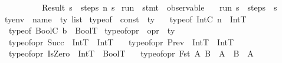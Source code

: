 \begin{isabellebody}
\ \ \ \ \ \ \ \ \ {\isacharbar}\ Result\ s{\isacharprime}\ {\isasymRightarrow}\ steps\ n\ s{\isacharprime}{\isacharparenright}{\isachardoublequoteclose}\isanewline
\isanewline
{}\isamarkupfalse \ run\ {\isacharcolon}{\isacharcolon}\ {\isachardoublequoteopen}stmt\ {\isasymRightarrow}\ observable{\isachardoublequoteclose}\ \isanewline
\ \ {\isachardoublequoteopen}run\ s\ {\isasymequiv}\ steps\ {}{}{}{}{}{}{}\ {\isacharparenleft}s{\isacharcomma}{\isacharbrackleft}{\isacharbrackright}{\isacharcomma}{\isacharbrackleft}{\isacharbrackright}{\isacharcomma}{\isacharbrackleft}{\isacharbrackright}{\isacharcomma}{\isacharbrackleft}{\isacharbrackright}{\isacharparenright}{\isachardoublequoteclose}
\isamarkuptrue {}\isamarkupfalse \ ty{\isacharunderscore}env\ {\isacharequal}\ {\isachardoublequoteopen}{\isacharparenleft}name\ {\isasymtimes}\ ty{\isacharparenright}\ list{\isachardoublequoteclose}\isanewline
\isanewline
{}\isamarkupfalse \ typeof\ {\isacharcolon}{\isacharcolon}\ {\isachardoublequoteopen}const\ {\isasymRightarrow}\ ty{\isachardoublequoteclose}\ \isanewline
\ \ {\isachardoublequoteopen}typeof\ {\isacharparenleft}IntC\ n{\isacharparenright}\ {\isacharequal}\ IntT{\isachardoublequoteclose}\ {\isacharbar}\isanewline
\ \ {\isachardoublequoteopen}typeof\ {\isacharparenleft}BoolC\ b{\isacharparenright}\ {\isacharequal}\ BoolT{\isachardoublequoteclose}\isanewline
\isanewline
{}\isamarkupfalse \ typeof{\isacharunderscore}opr\ {\isacharcolon}{\isacharcolon}\ {\isachardoublequoteopen}opr\ {\isasymRightarrow}\ ty{\isachardoublequoteclose}\ \isanewline
\ \ {\isachardoublequoteopen}typeof{\isacharunderscore}opr\ Succ\ {\isacharequal}\ {\isacharparenleft}IntT\ {\isasymrightarrow}\ IntT{\isacharparenright}{\isachardoublequoteclose}\ {\isacharbar}\isanewline
\ \ {\isachardoublequoteopen}typeof{\isacharunderscore}opr\ Prev\ {\isacharequal}\ {\isacharparenleft}IntT\ {\isasymrightarrow}\ IntT{\isacharparenright}{\isachardoublequoteclose}\ {\isacharbar}\isanewline
\ \ {\isachardoublequoteopen}typeof{\isacharunderscore}opr\ IsZero\ {\isacharequal}\ {\isacharparenleft}IntT\ {\isasymrightarrow}\ BoolT{\isacharparenright}{\isachardoublequoteclose}\ {\isacharbar}\isanewline
\ \ {\isachardoublequoteopen}typeof{\isacharunderscore}opr\ {\isacharparenleft}Fst\ A\ B{\isacharparenright}\ {\isacharequal}\ {\isacharparenleft}{\isacharparenleft}A\ {\isasymtimes}\ B{\isacharparenright}\ {\isasymrightarrow}\ A{\isacharparenright}{\isachardoublequoteclose}\ {\isacharbar}\isanewline

\end{isabellebody}
